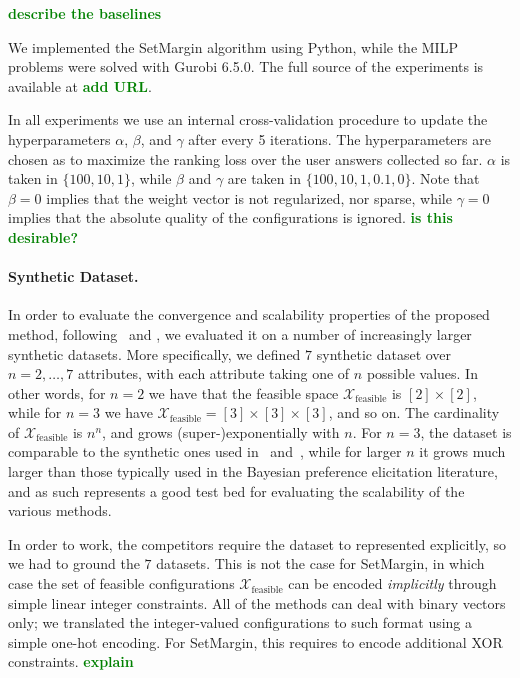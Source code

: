 \documentclass{article}
\renewcommand\[{\begin{equation}}
\renewcommand\]{\end{equation}}
\newcommand{\calvar}[1]{\ensuremath{\mathcal{#1}}}
\newcommand{\calX}{\calvar{X}}
\newcommand{\stefano}[1]{{\bf \textcolor{green}{{\fbox{Stefano:} #1}}}}
\begin{document}
\stefano{describe the baselines}

We implemented the {\sc SetMargin} algorithm using Python, while the MILP
problems were solved with Gurobi 6.5.0. The full source of the experiments is
available at \stefano{add URL}.

In all experiments we use an internal cross-validation procedure to update the
hyperparameters $\alpha$, $\beta$, and $\gamma$ after every 5 iterations. The
hyperparameters are chosen as to maximize the ranking loss over the user
answers collected so far. $\alpha$ is taken in $\{100, 10, 1\}$,
while $\beta$ and $\gamma$ are taken in $\{100, 10, 1, 0.1, 0\}$. Note that
$\beta=0$ implies that the weight vector is not regularized, nor sparse, while
$\gamma=0$ implies that the absolute quality of the configurations is ignored.
\stefano{is this desirable?}

\paragraph{Synthetic Dataset.} In order to evaluate the convergence and
scalability properties of the proposed method, following~\cite{guo2010real} and
\cite{viappiani2010optimal}, we evaluated it on a number of increasingly larger
synthetic datasets. More specifically, we defined $7$ synthetic dataset over
$n=2,\ldots,7$ attributes, with each attribute taking one of $n$ possible
values.
In other words, for $n=2$ we have that the feasible space
$\calX_\text{feasible}$ is $[2] \times [2]$, while for $n=3$ we have
$\calX_\text{feasible} = [3] \times [3] \times [3]$, and so on.
The cardinality of $\calX_\text{feasible}$ is $n^n$, and grows
(super-)exponentially with $n$. For $n=3$, the dataset is comparable to
the synthetic ones used in~\cite{guo2010real} and~\cite{viappiani2010optimal},
while for larger $n$ it grows much larger than those typically used in the
Bayesian preference elicitation literature, and as such represents a good
test bed for evaluating the scalability of the various methods.

In order to work, the competitors require the dataset to represented
explicitly, so we had to ground the $7$ datasets. This is not the case for {\sc
SetMargin}, in which case the set of feasible configurations
$\calX_\text{feasible}$ can be encoded {\em implicitly} through simple linear
integer constraints. All of the methods can deal with binary vectors only; we
translated the integer-valued configurations to such format using a simple
one-hot encoding. For {\sc SetMargin}, this requires to encode additional
XOR constraints. \stefano{explain}
\end{document}
